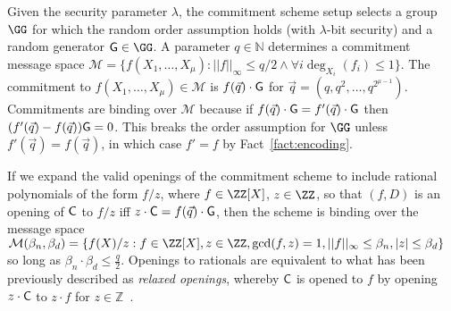 Given the security parameter $\lambda$, the commitment scheme setup selects a group $\GG$ for which the random order assumption holds (with  $\lambda$-bit security) and a random generator $\gr{G} \in \GG$. A parameter $q \in \mathbb{N}$ determines a commitment message space $\mathcal{M} = \{f(X_1,\dots,X_\mu): ||f||_\infty \leq q/2 \wedge \forall i \deg_{X_i}(f_i)\leq 1 \}$. The commitment to $f(X_1,\dots,X_\mu) \in \mathcal{M}$ is $f(\vec{q}) \cdot  \gr{G}$ for $\vec{q}=(q,q^2,\dots,q^{2^{\mu-1}})$. Commitments are binding over $\mathcal{M}$ because if $f(\vec{q}) \cdot \gr{G} = f'(\vec{q}) \cdot \gr{G}$ then $(f'(\vec{q}) - f(\vec{q})) \gr{G} = 0$. This breaks the order assumption for $\GG$ unless $ f'(\vec{q}) =  f(\vec{q})$, in which case $f' = f$ by Fact~\ref{fact:encoding}. 

If we expand the valid openings of the commitment scheme to include rational polynomials of the form $f/z$, where $f \in \ZZ[X]$, $z \in \ZZ$, so that $(f,D)$ is an opening of $\gr{C}$ to $f/z$ iff $z \cdot \gr{C} = f(\vec{q}) \cdot \gr{G}$, then the scheme is binding over the message space $\mathcal{M}(\beta_n, \beta_d) =  \{f(X)/z: f \in \ZZ[X], z \in \ZZ, \gcd(f,z) = 1, ||f||_\infty \leq \beta_n, |z| \leq \beta_d \}$ so long as $\beta_n \cdot \beta_d \leq \frac{q}{2}$. 
Openings to rationals are equivalent to what has been previously described as \emph{relaxed openings}, whereby $\gr{C}$ is opened to $f$ by opening $z \cdot \gr{C}$ to $z \cdot f$ for $z \in \mathbb{Z}$~\cite{C:BDFG21}. 

